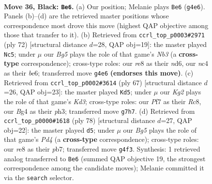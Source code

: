\documentclass[11pt]{article}
\begin{document}
\clearpage

\begin{figure}[p]\centering
\begin{subfigure}{0.46\textwidth}\centering
\resizebox{\linewidth}{!}{%
\newchessgame
\chessboard[
  setfen={4R3/5pk1/p1p5/P3P1p1/1PN3b1/8/8/b4K2 b - - 0 36},
  showmover=false,
  pgfstyle=straightmove, color=movearrow, markmove={g4-e6}
]}
\caption{}
\end{subfigure}\hfill
\begin{subfigure}{0.46\textwidth}\centering
\resizebox{\linewidth}{!}{%
\newchessgame
\chessboard[
  setfen={1k6/8/p2nb3/1p1p4/1P6/PN6/2P3B1/1K6 w - - 0 37},
  showmover=false,
  pgfstyle=straightmove, color=movearrow, markmove={b3-c5}
]}
\caption{}
\end{subfigure}
\\[4pt]
\begin{subfigure}{0.46\textwidth}\centering
\resizebox{\linewidth}{!}{%
\newchessgame
\chessboard[
  setfen={2r5/p7/3k1bp1/8/Np6/6PP/PP2R3/7K b - - 0 34},
  showmover=false,
  pgfstyle=straightmove, color=movearrow, markmove={d6-d5}
]}
\caption{}
\end{subfigure}\hfill
\begin{subfigure}{0.46\textwidth}\centering
\resizebox{\linewidth}{!}{%
\newchessgame
\chessboard[
  setfen={8/kp3p2/2p5/n7/P2P4/8/5PB1/6K1 w - - 0 40},
  showmover=false,
  pgfstyle=straightmove, color=movearrow, markmove={d4-d5}
]}
\caption{}
\end{subfigure}
\caption{\textbf{Move 36, Black: \texttt{Be6}.} (a) Our position; Melanie plays \texttt{Be6} (\texttt{g4e6}). Panels (b)--(d) are the retrieved master positions whose correspondence most drove this move (highest QAP objective among those that transfer to it). (b) Retrieved from \texttt{ccrl\_top\_p0003\#2971} (ply 72) [structural distance $d$=28, QAP obj=19]: the master played \texttt{Nc5}; under $\mu$ our \emph{Bg5} plays the role of that game's \emph{Nb3} (a \textbf{cross-type} correspondence); cross-type roles: our \emph{r}e8 as their \emph{n}d6, our \emph{n}c4 as their \emph{b}e6; transferred move \texttt{g4e6} \textbf{(endorses this move)}. (c) Retrieved from \texttt{ccrl\_top\_p0002\#3614} (ply 67) [structural distance $d$=26, QAP obj=23]: the master played \texttt{Kd5}; under $\mu$ our \emph{Kg2} plays the role of that game's \emph{Kd3}; cross-type roles: our \emph{P}f7 as their \emph{R}c8, our \emph{B}g4 as their \emph{p}h3; transferred move \texttt{g7h7}. (d) Retrieved from \texttt{ccrl\_top\_p0000\#1618} (ply 78) [structural distance $d$=27, QAP obj=22]: the master played \texttt{d5}; under $\mu$ our \emph{Bg5} plays the role of that game's \emph{Pd4} (a \textbf{cross-type} correspondence); cross-type roles: our \emph{r}e8 as their \emph{p}b7; transferred move \texttt{g4f3}. Synthesis: 1 retrieved analog transferred to \texttt{Be6} (summed QAP objective 19, the strongest correspondence among the candidate moves); Melanie committed it via the \texttt{search} selector.}
\label{fig:thought-m71}
\end{figure}
\end{document}
